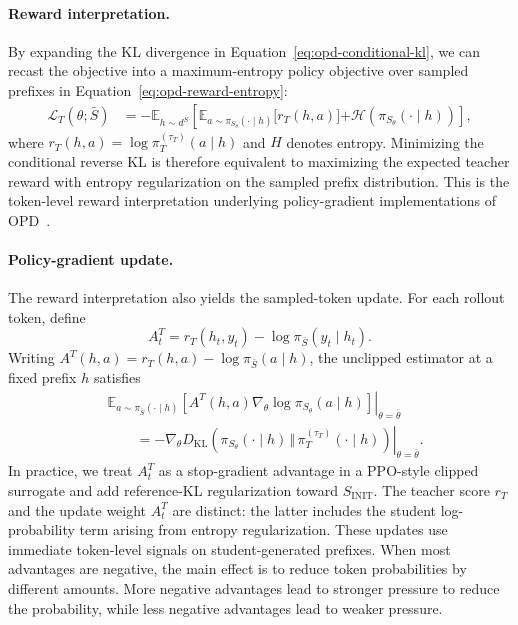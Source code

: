 \paragraph{Reward interpretation.}
By expanding the KL divergence in Equation~\eqref{eq:opd-conditional-kl}, we can recast the objective into a maximum-entropy policy objective over sampled prefixes in Equation~\ref{eq:opd-reward-entropy}:
\begin{equation}
\begin{aligned}\mathcal{L}_T(\theta;\bar S)
&=- \mathbb{E}_{h\sim d^{\bar S}}\!\left[
\mathbb{E}_{a\sim\pi_{S_\theta}(\cdot\mid h)}
\bigl[r_T(h,a)\bigr]
\right.\left.
+\mathcal{H}\!\left(\pi_{S_\theta}(\cdot\mid h)\right)
\right],
\end{aligned}
\label{eq:opd-reward-entropy}
\end{equation}
where \(r_T(h,a)=\log \pi_T^{(\tau_T)}(a\mid h)\) and \(H\) denotes entropy.
Minimizing the conditional reverse KL is therefore equivalent to maximizing the expected teacher reward with entropy regularization on the sampled prefix distribution. This is the token-level reward interpretation underlying policy-gradient implementations of OPD~\citep{lu2025onpolicydistillation}.

\paragraph{Policy-gradient update.}
The reward interpretation also yields the sampled-token update. For each rollout token, define
\begin{equation}
A_t^T
=r_T(h_t,y_t)-\log\pi_{\bar S}(y_t\mid h_t).
\label{eq:opd-teacher-advantage}
\end{equation}
Writing $A^T(h,a)=r_T(h,a)-\log\pi_{\bar S}(a\mid h)$, the unclipped estimator at a fixed prefix $h$ satisfies
\begin{equation}
\begin{aligned}
&\left.
\mathbb{E}_{a\sim\pi_{\bar S}(\cdot\mid h)}\!\left[
A^T(h,a)
\nabla_\theta\log\pi_{S_\theta}(a\mid h)
\right]\right|_{\theta=\bar\theta}
\\
&\qquad=
-\left.\nabla_\theta
D_{\mathrm{KL}}\!\left(
\pi_{S_\theta}(\cdot\mid h)
\,\Vert\,
\pi_T^{(\tau_T)}(\cdot\mid h)
\right)\right|_{\theta=\bar\theta}.
\end{aligned}
\label{eq:opd-gradient-identity}
\end{equation}
In practice, we treat $A_t^T$ as a stop-gradient advantage in a PPO-style clipped surrogate and add reference-KL regularization toward $S_{\mathrm{INIT}}$. The teacher score $r_T$ and the update weight $A_t^T$ are distinct: the latter includes the student log-probability term arising from entropy regularization. These updates use immediate token-level signals on student-generated prefixes.
When most advantages are negative, the main effect is to reduce token probabilities by different amounts.
More negative advantages lead to stronger pressure to reduce the probability, while less negative advantages lead to weaker pressure.


